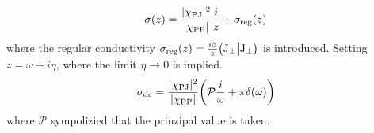 %
\begin{align}
	\sigma (z) = \frac{\vert\chi_{\mathrm{PJ}}\vert^{2}}{\vert\chi_{\mathrm{PP}}\vert} \frac{i}{z}  + \sigma_{\mathrm{reg}}(z)
\end{align}
%
where the regular conductivity $\sigma_{\mathrm{reg}}(z) = \frac{i \beta}{z} \big({\mathrm{J}_{\bot}}\big|{\mathrm{J}_{\bot}}\big)$ is introduced.
Setting $z = \omega + i\eta$, where the limit $\eta \to 0$ is implied.
%
\begin{align}
	\sigma_{\mathrm{dc}} = \frac{\vert\chi_{\mathrm{PJ}}\vert^{2}}{\vert\chi_{\mathrm{PP}}\vert} \bigg( \mathcal{P} \frac{i}{\omega} + \pi \delta(\omega) \bigg)
\end{align}
%
where $\mathcal{P}$ sympolizied that the prinzipal value is taken.
































